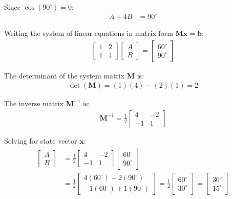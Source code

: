 \begin{enumerate}[label=\thesubsection.\arabic*, ref=\thesubsection.\theenumi]
	Since $\cos(90^\circ) = 0$:
	\begin{align*}
		A + 4B &= 90^\circ
	\end{align*}
	
	Writing the system of linear equations in matrix form $\mathbf{M}\mathbf{x} = \mathbf{b}$:
	\begin{align*}
		\begin{bmatrix} 1 & 2 \\ 1 & 4 \end{bmatrix} \begin{bmatrix} A \\ B \end{bmatrix} = \begin{bmatrix} 60^\circ \\ 90^\circ \end{bmatrix}
	\end{align*}
	
	The determinant of the system matrix $\mathbf{M}$ is:
	\begin{align*}
		\det(\mathbf{M}) = (1)(4) - (2)(1) = 2
	\end{align*}
	
	The inverse matrix $\mathbf{M}^{-1}$ is:
	\begin{align*}
		\mathbf{M}^{-1} = \frac{1}{2} \begin{bmatrix} 4 & -2 \\ -1 & 1 \end{bmatrix}
	\end{align*}
	
	Solving for state vector $\mathbf{x}$:
	\begin{align*}
		\begin{bmatrix} A \\ B \end{bmatrix} &= \frac{1}{2} \begin{bmatrix} 4 & -2 \\ -1 & 1 \end{bmatrix} \begin{bmatrix} 60^\circ \\ 90^\circ \end{bmatrix} \\
		&= \frac{1}{2} \begin{bmatrix} 4(60^\circ) - 2(90^\circ) \\ -1(60^\circ) + 1(90^\circ) \end{bmatrix} = \frac{1}{2} \begin{bmatrix} 60^\circ \\ 30^\circ \end{bmatrix} = \begin{bmatrix} 30^\circ \\ 15^\circ \end{bmatrix}
	\end{align*}
	

\end{enumerate}
